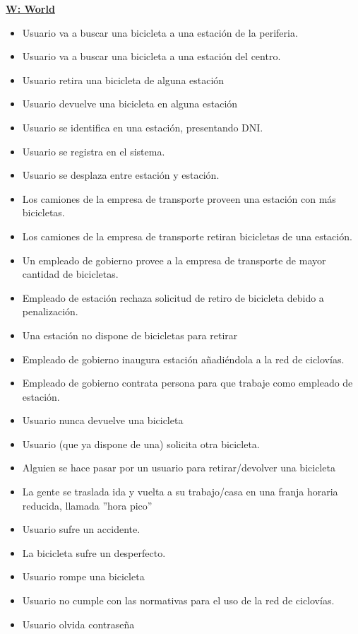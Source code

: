 \vspace{1cm}
\textbf{\underline{W: World}}

\begin{itemize}
\item Usuario va a buscar una bicicleta a una estación de la periferia.
\item Usuario va a buscar una bicicleta a una estación del centro.
\item Usuario retira una bicicleta de alguna estación
\item Usuario devuelve una bicicleta en alguna estación
\item Usuario se identifica en una estación, presentando DNI.
\item Usuario se registra en el sistema.
\item Usuario se desplaza entre estación y estación.
\item Los camiones de la empresa de transporte proveen una estación con más bicicletas.
\item Los camiones de la empresa de transporte retiran bicicletas de una estación.
\item Un empleado de gobierno provee a la empresa de transporte de mayor cantidad de bicicletas.
\item Empleado de estación rechaza solicitud de retiro de bicicleta debido a penalización.
\item Una estación no dispone de bicicletas para retirar
\item Empleado de gobierno inaugura estación añadiéndola a la red de ciclovías.
\item Empleado de gobierno contrata persona para que trabaje como empleado de estación.
\item Usuario nunca devuelve una bicicleta
\item Usuario (que ya dispone de una) solicita otra bicicleta.
\item Alguien se hace pasar por un usuario para retirar/devolver una bicicleta
\item La gente se traslada ida y vuelta a su trabajo/casa en una franja horaria reducida, llamada ''hora pico''
\item Usuario sufre un accidente.
\item La bicicleta sufre un desperfecto.
\item Usuario rompe una bicicleta
\item Usuario no cumple con las normativas para el uso de la red de ciclovías.
\item Usuario olvida contraseña

\end{itemize}
